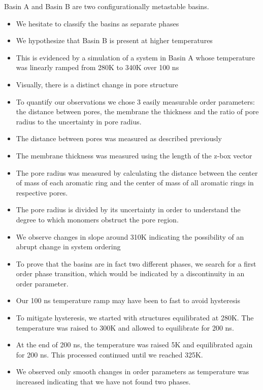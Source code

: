 \documentclass{article}
\begin{document}
Basin A and Basin B are two configurationally metastable basins. 
\begin{itemize}
	\item We hesitate to classify the basins as separate phases
	\item We hypothesize that Basin B is present at higher temperatures
	\item This is evidenced by a simulation of a system in Basin A whose temperature was linearly ramped from 280K to 340K over 100 ns
	\item Visually, there is a distinct change in pore structure
	\item To quantify our observations we chose 3 easily measurable order parameters: the distance between pores, the membrane the thickness and the ratio of pore radius to the uncertainty in pore radius.
	\item The distance between pores was measured as described previously
	\item The membrane thickness was measured using the length of the z-box vector
	\item The pore radius was measured by calculating the distance between the center of mass of each aromatic ring and the center of mass of all aromatic rings in respective pores.
	\item The pore radius is divided by its uncertainty in order to understand the degree to which monomers obstruct the pore region.
	\item We observe changes in slope around 310K indicating the possibility of an abrupt change in system ordering
	\item To prove that the basins are in fact two different phases, we search for a first order phase transition, which would be indicated by a discontinuity in an order parameter.
	\item Our 100 ns temperature ramp may have been to fast to avoid hysteresis
	\item To mitigate hysteresis, we started with structures equilibrated at 280K. The temperature was raised to 300K and allowed to equilibrate for 200 ns.
	\item At the end of 200 ns, the temperature was raised 5K and equilibrated again for 200 ns. This processed continued until we reached 325K. 
	\item We observed only smooth changes in order parameters as temperature was increased indicating that we have not found two phases.
\end{itemize}
\end{document}
